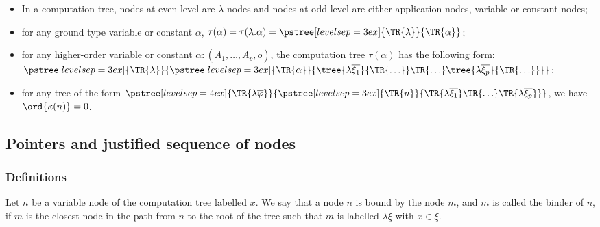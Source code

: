 \begin{remark} \hfill
\begin{itemize}
\item In a computation tree, nodes at even level are $\lambda$-nodes and nodes at odd level are either application nodes,
variable or constant nodes;

\item for any ground type variable or constant $\alpha$,
$\tau(\alpha) = \tau(\lambda . \alpha) =  \pstree[levelsep=3ex]
    { \TR{\lambda } }
    { \TR{\alpha}
    }$;

\item for any higher-order variable or constant $\alpha : (A_1,\ldots,A_p,o)$, the computation tree $\tau(\alpha)$ has the following form:
$ \pstree[levelsep=3ex]{\TR{\lambda}}
        {\pstree[levelsep=3ex]
                { \TR{\alpha} }
                { \tree{\lambda \overline{\xi_1}}{\TR{\ldots}} \TR{\ldots} \tree{\lambda \overline{\xi_p}}{\TR{\ldots}}
                }
        }
$;

\item for any tree of the form
        $ \pstree[levelsep=4ex]
            { \TR{\lambda \overline{\varphi}} }
            { \pstree[levelsep=3ex]
                {\TR{n}}
                {\TR{\lambda \overline{\xi_1}} \TR{\ldots} \TR{\lambda \overline{\xi_p}}}
            }
        $,
    we have $\ord{\kappa(n)}=0$.

\end{itemize}
\end{remark}


\subsection{Pointers and justified sequence of nodes}
\subsubsection{Definitions}
\begin{definition}[Binder]
Let $n$ be a variable node of the computation tree labelled $x$. We
say that a node $n$ is bound by the node $m$, and $m$ is called the
binder of $n$, if $m$ is the closest node in the path from $n$ to
the root of the tree such that $m$ is labelled $\lambda
\overline{\xi}$ with $x\in \overline{\xi}$.
\end{definition}


